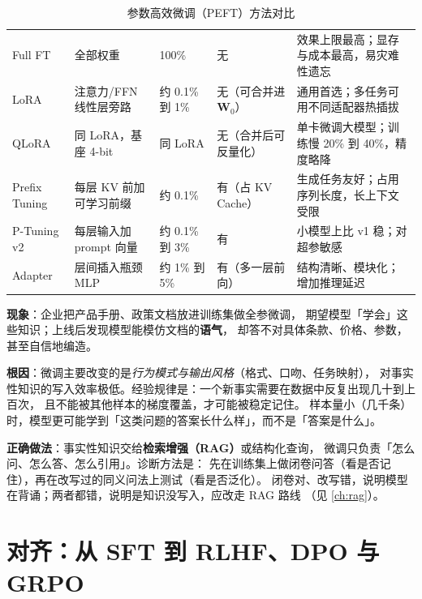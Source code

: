 \begin{table}[htbp]
\centering
\caption{参数高效微调（PEFT）方法对比}
\label{tab:peft-compare}
\small
\begin{tabularx}{\textwidth}{L{1.9cm} L{2.1cm} L{1.7cm} L{1.8cm} Y}
\toprule
{} &  &  &  &  \\
\midrule
Full FT & 全部权重 & 100\% & 无 & 效果上限最高；显存与成本最高，易灾难性遗忘 \\
\addlinespace
LoRA & 注意力/FFN 线性层旁路 & 约 0.1\% 到 1\% & 无（可合并进 $\bm{W}_0$） & 通用首选；多任务可用不同适配器热插拔 \\
\addlinespace
QLoRA & 同 LoRA，基座 4-bit & 同 LoRA & 无（合并后可反量化） & 单卡微调大模型；训练慢 20\% 到 40\%，精度略降 \\
\addlinespace
Prefix Tuning & 每层 KV 前加可学习前缀 & 约 0.1\% & 有（占 KV Cache） & 生成任务友好；占用序列长度，长上下文受限 \\
\addlinespace
P-Tuning v2 & 每层输入加 prompt 向量 & 约 0.1\% 到 3\% & 有 & 小模型上比 v1 稳；对超参敏感 \\
\addlinespace
Adapter & 层间插入瓶颈 MLP & 约 1\% 到 5\% & 有（多一层前向） & 结构清晰、模块化；增加推理延迟 \\
\bottomrule
\end{tabularx}
\end{table}

\begin{pitfall}[微调不等于知识注入]
\textbf{现象}：企业把产品手册、政策文档放进训练集做全参微调，
期望模型「学会」这些知识；上线后发现模型能模仿文档的\textbf{语气}，
却答不对具体条款、价格、参数，甚至自信地编造。

\textbf{根因}：微调主要改变的是\emph{行为模式与输出风格}（格式、口吻、任务映射），
对事实性知识的写入效率极低。经验规律是：一个新事实需要在数据中反复出现几十到上百次，
且不能被其他样本的梯度覆盖，才可能被稳定记住。
样本量小（几千条）时，模型更可能学到「这类问题的答案长什么样」，而不是「答案是什么」。

\textbf{正确做法}：事实性知识交给\textbf{检索增强（RAG）}或结构化查询，
微调只负责「怎么问、怎么答、怎么引用」。诊断方法是：
先在训练集上做闭卷问答（看是否记住），再在改写过的同义问法上测试（看是否泛化）。
闭卷对、改写错，说明模型在背诵；两者都错，说明是知识没写入，应改走 RAG 路线
（见 \cref{ch:rag}）。
\end{pitfall}

\section{对齐：从 SFT 到 RLHF、DPO 与 GRPO}
\label{sec:nlp-alignment}

